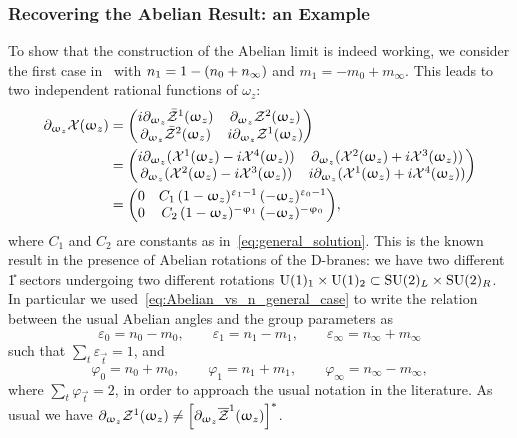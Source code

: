\subsubsection{Recovering the Abelian Result: an Example}

To show that the construction of the Abelian limit is indeed working, we consider the first case in~ with $n_{1} = 1 - \qty( n_{0} + n_{\infty} )$ and $m_{1} = -m_{0} + m_{\infty}$.
This leads to two independent rational functions of $\omega_z$:
\begin{equation}
  \begin{split}
    \ipd{\omega_z} \cX(\omega_z)
    & =
    \mqty( i \ipd{\omega_z} \bar{\cZ}^1(\omega_z) &
           \ipd{\omega_z} \cZ^{2}(\omega_z)
           \\
           \ipd{\omega_z} \bar{\cZ}^{2}(\omega_z) &
           i \ipd{\omega_z} \cZ^{1}(\omega_z)
    )
    \\
    & =
    \mqty( i \ipd{\omega_z} ( \cX^1(\omega_z) - i \cX^4(\omega_z) ) &
           \ipd{\omega_z} ( \cX^2(\omega_z) + i \cX^3(\omega_z) )
           \\
           \ipd{\omega_z} ( \cX^2(\omega_z) - i \cX^3(\omega_z) )   &
           i \ipd{\omega_z} ( \cX^1(\omega_z) + i \cX^4(\omega_z) )
    )
    \\
    & =
    \mqty( 0 &
           C_1\,
           (1-\omega_z)^{\varepsilon_{1}-1}\,
           (-\omega_z)^{\varepsilon_{0}-1}
           \\
           0 &
           C_2\,
           (1-\omega_z)^{-\varphi_{1}}\,
           (-\omega_z)^{-\varphi_{0}}
    ),
  \end{split}
  \label{eq:Abelian_sol_example}
\end{equation}
where $C_1$ and $C_2$ are constants as in~\eqref{eq:general_solution}.
This is the known result in the presence of Abelian rotations of the D-branes: we have two different \U{1} sectors undergoing two different rotations
$\mathrm{U}(1)_1 \times \mathrm{U}(1)_2 \subset \mathrm{SU}(2)_L \times \mathrm{SU}(2)_R$.
In particular we used~\eqref{eq:Abelian_vs_n_general_case} to write the relation between the usual Abelian angles and the group parameters as
\begin{equation}
  \varepsilon_{0} = n_{0} - m_{0},
  \qquad
  \varepsilon_{1} = n_{1} - m_{1},
  \qquad
  \varepsilon_{\infty} = n_{\infty} + m_{\infty}
\end{equation}
such that $\sum\limits_{t} \varepsilon_{\vec{t}} = 1$, and
\begin{equation}
  \varphi_{0} = n_{0} + m_{0},
  \qquad
  \varphi_{1} = n_{1} + m_{1},
  \qquad
  \varphi_{\infty} = n_{\infty} - m_{\infty},
  \label{eq:Abelian_rotation_second}
\end{equation}
where $\sum\limits_{t} \varphi_{\vec{t}} = 2$, in order to approach the usual notation in the literature.
As usual we have $\partial_{\upomega_z} \mathcal{Z}^1( \upomega_z ) \neq \qty[ \partial_{\upomega_z} \overline{\mathcal{Z}}^1( \upomega_z ) ]^*$.

